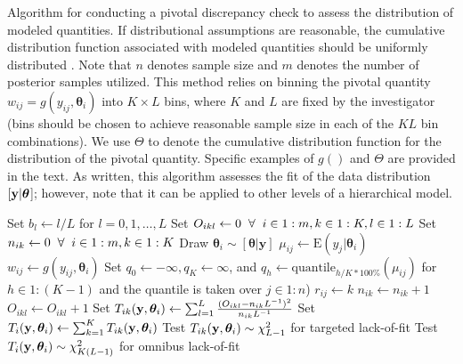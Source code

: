 \documentclass[12pt,english]{article}
\def\VAR{{\rm Var}\,}
\def\bftheta{\boldsymbol{\theta}}
\begin{document}
\begin{flushleft}
\begin{algorithm}
\caption{Algorithm for conducting a pivotal discrepancy check to assess the distribution of modeled quantities.  If distributional assumptions are reasonable, the cumulative distribution function associated with modeled quantities should be uniformly distributed \citep{Johnson2004,YuanJohnson2012}. Note that $n$ denotes sample size and $m$ denotes the number of posterior samples utilized.  This method relies on binning the pivotal quantity $w_{ij} = g(y_{ij},\boldsymbol{\theta}_i)$ into $K \times L$ bins, where $K$ and $L$ are fixed by the investigator (bins should be chosen to achieve reasonable sample size in each of the $KL$ bin combinations).  We use $\Theta$ to denote the cumulative distribution function for the distribution of the pivotal quantity.  Specific examples of $g()$ and $\Theta$ are provided in the text.  As written, this algorithm assesses the fit of the data distribution $[{\bf y}|\boldsymbol{\theta}$]; however, note that it can be applied to other levels of a hierarchical model.}
\label{alg:pivot}
\begin{algorithmic}
\STATE Set $b_l \leftarrow l/L$ for $l=0,1,\hdots,L$
\STATE Set $O_{ikl} \leftarrow 0 \hspace{2mm} \forall \hspace{2mm} i \in 1:m, k \in 1:K, l \in 1:L$
\STATE Set $n_{ik} \leftarrow 0 \hspace{2mm} \forall \hspace{2mm} i \in 1:m, k \in 1:K$
  \STATE Draw $\boldsymbol{\theta}_i \sim [\boldsymbol{\theta}|\textbf{y}]$
    \STATE $\mu_{ij} \leftarrow \textrm{E}(y_j|\boldsymbol{\theta}_i)$
    \STATE $w_{ij} \leftarrow g(y_{ij},\boldsymbol{\theta}_i)$
  \ENDFOR
  \STATE Set $q_0 \leftarrow -\infty, q_{K} \leftarrow \infty$, and $q_h \leftarrow \textrm{quantile}_{h/K*100\%}(\mu_{ij})$ for $h \in 1:(K-1)$ and the quantile is taken over $j \in 1:n$)
        \STATE $r_{ij} \leftarrow k$
        \STATE $n_{ik} \leftarrow n_{ik}+1$
      \ENDIF
    \ENDFOR
      \IF{$\Theta(w_{ij}) \in (b_{l-1},b_l]$ \& $r_{ij}==k$}
        \STATE $O_{ikl} \leftarrow O_{ikl}+1$
      \ENDIF
    \ENDFOR
    \STATE Set $T_{ik}({\bf y},\bftheta_i) \leftarrow \sum_{l=1}^L \frac{(O_{ikl}-n_{ik}L^{-1})^2}{n_{ik}L^{-1}} $
  \ENDFOR
  \STATE Set $T_i({\bf y},\bftheta_i) \leftarrow \sum_{k=1}^K T_{ik}({\bf y},\bftheta_i)$
\ENDFOR
\STATE Test $T_{ik}({\bf y},\bftheta_i) \sim \chi^2_{L-1}$ for targeted lack-of-fit
\STATE Test $T_{i}({\bf y},\bftheta_i) \sim \chi^2_{K(L-1)}$ for omnibus lack-of-fit
\end{algorithmic}
\end{algorithm}



\end{flushleft}
\end{document}
